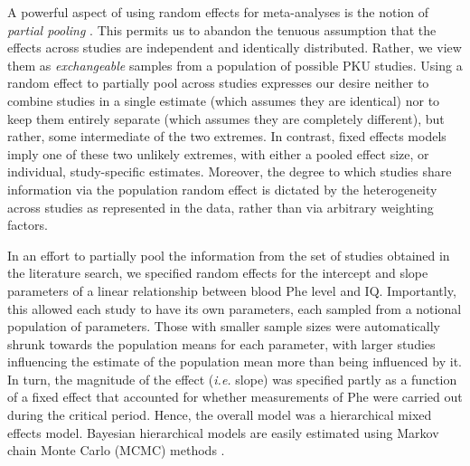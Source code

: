 \documentclass{svjour3}                     %
\begin{document}
A powerful aspect of using random effects for meta-analyses is the notion of \emph{partial pooling} \citep{Gelman:2003vk}. This permits us to abandon the tenuous assumption that the effects across studies are independent and identically distributed. Rather, we view them as \emph{exchangeable} samples from a population of possible PKU studies. Using a random effect to partially pool across studies expresses our desire neither to combine studies in a single estimate (which assumes they are identical) nor to keep them entirely separate (which assumes they are completely different), but rather, some intermediate of the two extremes. In contrast, fixed effects models imply one of these two unlikely extremes, with either a pooled effect size, or individual, study-specific estimates. Moreover, the degree to which studies share information via the population random effect is dictated by the heterogeneity across studies as represented in the data, rather than via arbitrary weighting factors.


In an effort to partially pool the information from the set of studies obtained in the literature search, we specified random effects for the intercept and slope parameters of a linear relationship between blood Phe level and IQ. Importantly, this allowed each study to have its own parameters, each sampled from a notional population of parameters. Those with smaller sample sizes were automatically shrunk towards the population means for each parameter, with larger studies influencing the estimate of the population mean more than being influenced by it. In turn, the magnitude of the effect (\emph{i.e.} slope) was specified partly as a function of a fixed effect that accounted for whether measurements of Phe were carried out during the critical period. Hence, the overall model was a hierarchical mixed effects model. Bayesian hierarchical models are easily estimated using Markov chain Monte Carlo (MCMC) methods \citep{Brooks:2010vi}.
\end{document}
